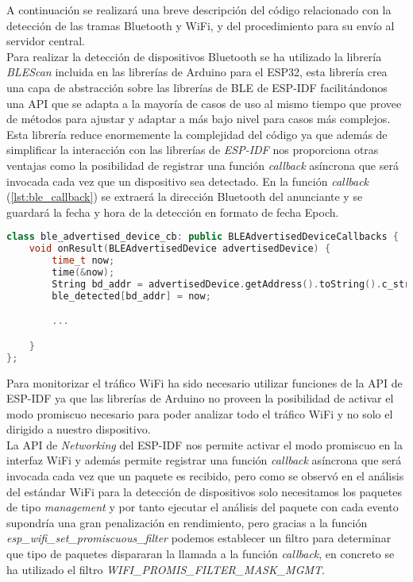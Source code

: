 \documentclass[../proyecto.tex]{subfiles}
\begin{document}
A continuación se realizará una breve descripción del código relacionado con la detección de las tramas Bluetooth y WiFi, y del procedimiento para su envío al servidor central.\\

Para realizar la detección de dispositivos Bluetooth se ha utilizado la librería \textit{BLEScan} incluida en las librerías de Arduino para el ESP32, esta librería crea una capa de abstracción sobre las librerías de BLE de ESP-IDF facilitándonos una API que se adapta a la mayoría de casos de uso al mismo tiempo que provee de métodos para ajustar y adaptar a más bajo nivel para casos más complejos. Esta librería reduce enormemente la complejidad del código ya que además de simplificar la interacción con las librerías de \textit{ESP-IDF} nos proporciona otras ventajas como la posibilidad de registrar una función \textit{callback} asíncrona que será invocada cada vez que un dispositivo sea detectado. En la función \textit{callback} (\autoref{lst:ble_callback}) se extraerá la dirección Bluetooth del anunciante y se guardará la fecha y hora de la detección en formato de fecha Epoch.\\

\begin{lstlisting}[language=C++, caption=Función \textit{callback} para el escaneo BLE, captionpos=b, frame=single, label={lst:ble_callback}]
class ble_advertised_device_cb: public BLEAdvertisedDeviceCallbacks {
    void onResult(BLEAdvertisedDevice advertisedDevice) {
        time_t now;
        time(&now);
        String bd_addr = advertisedDevice.getAddress().toString().c_str();
        ble_detected[bd_addr] = now;

        ...

    }
};
\end{lstlisting}


Para monitorizar el tráfico WiFi ha sido necesario utilizar funciones de la API de ESP-IDF ya que las librerías de Arduino no proveen la posibilidad de activar el modo promiscuo necesario para poder analizar todo el tráfico WiFi y no solo el dirigido a nuestro dispositivo.\\

La API de \textit{Networking} del ESP-IDF nos permite activar el modo promiscuo en la interfaz WiFi y además permite registrar una función \textit{callback} asíncrona que será invocada cada vez que un paquete es recibido, pero como se observó en el análisis del estándar WiFi para la detección de dispositivos solo necesitamos los paquetes de tipo \textit{management} y por tanto ejecutar el análisis del paquete con cada evento supondría una gran penalización en rendimiento, pero gracias a la función \textit{esp\_wifi\_set\_promiscuous\_filter} podemos establecer un filtro para determinar que tipo de paquetes dispararan la llamada a la función \textit{callback}, en concreto se ha utilizado el filtro \textit{WIFI\_PROMIS\_FILTER\_MASK\_MGMT}.\\
\end{document}
